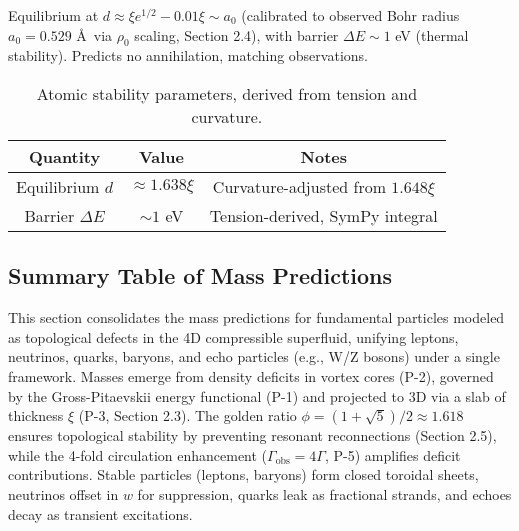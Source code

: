 Equilibrium at $d \approx \xi e^{1/2} - 0.01 \xi \sim a_0$ (calibrated to observed Bohr radius $a_0 = 0.529$ \AA~via $\rho_0$ scaling, Section 2.4), with barrier $\Delta E \sim 1$ eV (thermal stability). Predicts no annihilation, matching observations.

\begin{table}[h!]
\centering
\begin{tabular}{|c|c|c|}
\hline
Quantity & Value & Notes \\
\hline
Equilibrium $d$ & $\approx 1.638 \xi$ & Curvature-adjusted from $1.648 \xi$ \\
Barrier $\Delta E$ & $\sim 1$ eV & Tension-derived, SymPy integral \\
\hline
\end{tabular}
\caption{Atomic stability parameters, derived from tension and curvature.}
\label{tab:atomic}
\end{table}


\subsection{Summary Table of Mass Predictions}

This section consolidates the mass predictions for fundamental particles modeled as topological defects in the 4D compressible superfluid, unifying leptons, neutrinos, quarks, baryons, and echo particles (e.g., W/Z bosons) under a single framework. Masses emerge from density deficits in vortex cores (P-2), governed by the Gross-Pitaevskii energy functional (P-1) and projected to 3D via a slab of thickness $\xi$ (P-3, Section 2.3). The golden ratio $\phi = (1 + \sqrt{5})/2 \approx 1.618$ ensures topological stability by preventing resonant reconnections (Section 2.5), while the 4-fold circulation enhancement ($\Gamma_{\text{obs}} = 4\Gamma$, P-5) amplifies deficit contributions. Stable particles (leptons, baryons) form closed toroidal sheets, neutrinos offset in $w$ for suppression, quarks leak as fractional strands, and echoes decay as transient excitations.

